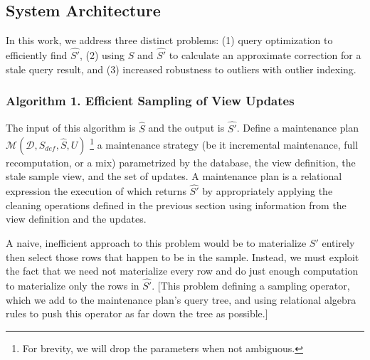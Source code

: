 
\subsection{System Architecture}

In this work, we address three distinct problems: (1) query optimization to efficiently find $\hat{S'}$, (2) using $\hat{S}$ and $\hat{S'}$ to calculate an approximate correction for a stale query result, and (3) increased robustness to outliers with outlier indexing.

\subsubsection{Algorithm 1. Efficient Sampling of View Updates }
The input of this algorithm is $\hat{S}$ and the output is $\hat{S'}$.
Define a maintenance plan $\mathcal{M}(\mathcal{D},S_{def},\hat{S},U)$ \footnote{For brevity, we will drop the parameters when not ambiguous.} a maintenance strategy (be it incremental maintenance, full recomputation, or a mix) parametrized by the database, the view definition, the stale sample view, and the set of updates. 
A maintenance plan is a relational expression the execution of which returns $\hat{S'}$ by appropriately applying the cleaning operations defined in the previous section using information from the view definition and the updates.

A naive, inefficient approach to this problem would be to materialize $S'$ entirely then select those rows that happen to be in the sample.
Instead, we must exploit the fact that we need not materialize every row and do just enough computation to materialize only the rows in $\hat{S'}$.
[This problem defining a sampling operator, which we add to the maintenance plan's query tree, and using relational algebra rules to push this operator as far down the tree as possible.] 

